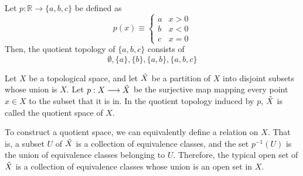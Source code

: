 \documentclass{article}
\begin{document}
    \begin{example}
    Let $p: \mathbb{R} \longrightarrow \{a, b, c\}$ be defined as 
    \[p(x) \equiv \begin{cases}
          a & x > 0 \\
          b & x < 0 \\
          c & x = 0
    \end{cases}\]
    Then, the quotient topology of $\{a, b, c\}$ consists of 
    \[\emptyset, \{a\}, \{b\}, \{a, b\}, \{a, b, c\}\]
    \end{example}

    \begin{definition}
    Let $X$ be a topological space, and let $\Tilde{X}$ be a partition of $X$ into disjoint subsets whose union is $X$. Let $p: X \longrightarrow \Tilde{X}$ be the surjective map mapping every point $x \in X$ to the subset that it is in. In the quotient topology induced by $p$, $\Tilde{X}$ is called the quotient space of $X$. 
    \end{definition}

    To construct a quotient space, we can equivalently define a relation on $X$. That is, a subset $U$ of $\Tilde{X}$ is a collection of equivalence classes, and the set $p^{-1}(U)$ is the union of equivalence classes belonging to $U$. Therefore, the typical open set of $\Tilde{X}$ is a collection of equivalence classes whose union is an open set in $X$. 
\end{document}
